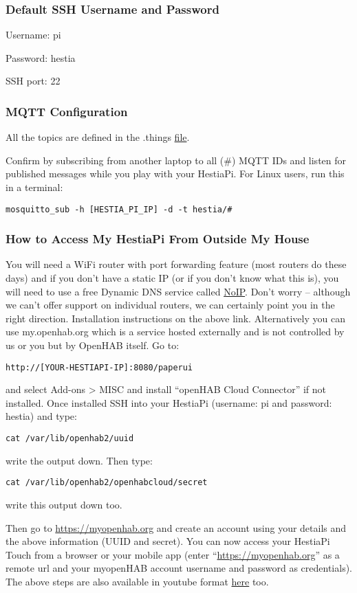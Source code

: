 \subsubsection{Default SSH Username and Password}

Username: pi

Password: hestia

SSH port: 22

\subsubsection{MQTT Configuration}
All the topics are defined in the .things
\href{https://github.com/HestiaPi/hestia-touch-openhab/wiki/File-Structure-&-Paths-ONE}{file}.

Confirm by subscribing from another laptop to all (\#) MQTT IDs and listen for
published messages while you play with your HestiaPi. For Linux users, run this
in a terminal:

\texttt{mosquitto\_sub -h [HESTIA\_PI\_IP] -d -t hestia/\#}

\subsubsection{How to Access My HestiaPi From Outside My House}

You will need a WiFi router with port forwarding feature (most routers do these
days) and if you don’t have a static IP (or if you don’t know what this is),
you will need to use a free Dynamic DNS service called
\href{https://www.noip.com/support/knowledgebase/install-ip-duc-onto-raspberry-pi/}{NoIP}.
Don’t worry -- although we can’t offer support on individual routers, we can
certainly point you in the right direction. Installation instructions on the
above link.  Alternatively you can use my.openhab.org which is a service hosted
externally and is not controlled by us or you but by OpenHAB itself. Go to:

\texttt{http://[YOUR-HESTIAPI-IP]:8080/paperui}

and select Add-ons > MISC and install ``openHAB Cloud Connector'' if not
installed. Once installed SSH into your HestiaPi (username: pi and password:
hestia) and type:

\texttt{cat /var/lib/openhab2/uuid}

write the output down. Then type:

\texttt{cat /var/lib/openhab2/openhabcloud/secret}

write this output down too.

Then go to \url{https://myopenhab.org} and create an account using your details
and the above information (UUID and secret). You can now access your HestiaPi
Touch from a browser or your mobile app (enter ``\url{https://myopenhab.org}''
as a remote url and your myopenHAB account username and password as
credentials).  The above steps are also available in youtube format
\href{https://www.youtube.com/watch?v=joz5f4ejJVc}{here} too.

